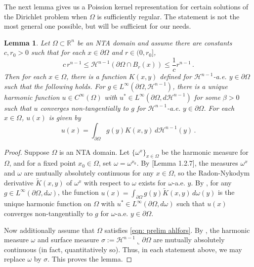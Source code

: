 \documentclass[10pt,a4paper]{amsart}
\numberwithin{equation}{section}
\newtheorem{lemma}[theorem]{Lemma}
\def\R{{\mathbb R}}
\def\w{\omega}
\def\W{\Omega}
\def\om{\omega}
\def\pa{{\partial}}
\begin{document}
The next lemma gives us a Poission kernel representation for certain solutions of the Dirichlet problem when $\W$ is sufficiently regular. The statement is not the most general one possible, but will be sufficient for our needs.
\begin{lemma}\label{lem: poisson kernel}
    Let $\W \subset \R^n$ be an NTA domain and assume there are  constants $c,r_0 >0$ such that for each $x \in \partial \W$ and $r\in (0,r_0]$,
\begin{equation}\label{eqn: prelim ahlfors}
   c \, r^{n-1} \leq   \mathcal{H}^{n-1} (\partial \W \cap B_r(x) ) \leq \frac{1}{c} r^{n-1}\,.
\end{equation}
Then for each $x \in \W$, there is a function $K(x,y)$ defined  for $\mathcal{H}^{n-1}$-a.e. $y \in \partial \W$ such that the following holds. 
%
For $g\in L^\infty(\partial \W,  \mathcal{H}^{n-1})$, there is a unique harmonic function $u \in C^\infty(\W)$ with $u^* \in L^\infty(\partial \W, d\mathcal{H}^{n-1})$ for some $\beta>0$ such that $u$ converges non-tangentially to $g$ for $\mathcal{H}^{n-1}$-a.e. $y \in \partial \W$. For each $x \in \W$, $u(x)$ is given by
$$
u(x) = \int_{\partial \W} g(y){K}(x,y) \, d \mathcal{H}^{n-1}(y)\,.
$$
\end{lemma}
\begin{proof}
Suppose $\W$ is an NTA domain. Let $\{\w^x\}_{x\in \W}$ be the harmonic measure for $\W$, and for a fixed point $x_0 \in \W$, set $\w= \w^{x_0}$. By [Lemma 1.2.7]\cite{k94}, the measures $\w^x$ and $\w$ are mutually absolutely continuous for any $x \in \W$, so 
the Radon-Nykodym  derivative $\tilde{K}(x,y)$ of $\w^x$ with respect to $\w$
 exists for $\w$-a.e. $y$. By \cite[Corollary 1.4.3, Theorem 1.4.4]{k94}, for any $g \in  L^\infty(\pa \W, d \om)$, the function 
$u(x) = \int_{\partial \W} g(y)\tilde{K}(x,y) \, d\om(y)$
is the unique harmonic function on $\W$ with $u^* \in L^\infty(\partial \W, d\om)$ such that  $u(x)$ converges non-tangentially to $g$ for $\om$-a.e. $y \in \partial \W$. 

Now additionally assume that $\W$ satisfies \eqref{eqn: prelim ahlfors}. By \cite[Theorem 2]{DavidJerison}, the harmonic measure $\w$ and surface measure $\sigma:= \mathcal{H}^{n-1}\llcorner \partial \W$ are mutually absolutely continuous (in fact, quantitatively so). Thus, in each statement above, we may replace $\om$ by $\sigma$. This proves the lemma.
\end{proof}
\end{document}
